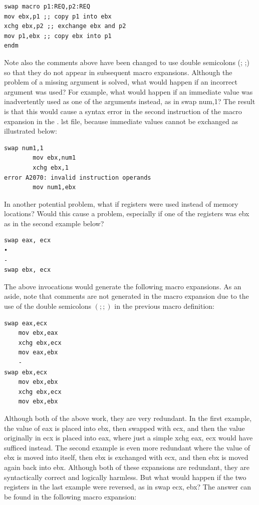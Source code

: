\documentclass[10pt]{book}
\begin{document}
\begin{center}
\begin{center}
\begin{verbatim}
swap macro p1:REQ,p2:REQ
mov ebx,p1 ;; copy p1 into ebx
xchg ebx,p2 ;; exchange ebx and p2
mov p1,ebx ;; copy ebx into p1
endm
\end{verbatim}

Note also the comments above have been changed to use double semicolons (; ;) so that they do not appear in subsequent macro expansions. Although the problem of a missing argument is solved, what would happen if an incorrect argument was used? For example, what would happen if an immediate value was inadvertently used as one of the arguments instead, as in swap num,1? The result is that this would cause a syntax error in the second instruction of the macro\\
expansion in the . lst file, because immediate values cannot be exchanged as illustrated below:


\begin{verbatim}
swap num1,1
        mov ebx,num1
        xchg ebx,1
error A2070: invalid instruction operands
        mov num1,ebx
\end{verbatim}

In another potential problem, what if registers were used instead of memory locations? Would this cause a problem, especially if one of the registers was ebx as in the second example below?

\begin{verbatim}
swap eax, ecx
•
-
swap ebx, ecx
\end{verbatim}

The above invocations would generate the following macro expansions. As an aside, note that comments are not generated in the macro expansion due to the use of the double semicolons $(; ;)$ in the previous macro definition:

\begin{verbatim}
swap eax,ecx
    mov ebx,eax
    xchg ebx,ecx
    mov eax,ebx
    -
swap ebx,ecx
    mov ebx,ebx
    xchg ebx,ecx
    mov ebx,ebx
\end{verbatim}

Although both of the above work, they are very redundant. In the first example, the value of eax is placed into ebx, then swapped with ecx, and then the value originally in ecx is placed into eax, where just a simple xchg eax, ecx would have sufficed instead. The second example is even more redundant where the value of ebx is moved into itself, then ebx is exchanged with ecx, and then ebx is moved again back into ebx. Although both of these expansions are redundant, they are syntactically correct and logically harmless. But what would happen if the two registers in the last example were reversed, as in swap ecx, ebx? The answer can be found in the following macro expansion:


\end{center}
\end{center}
\end{document}
